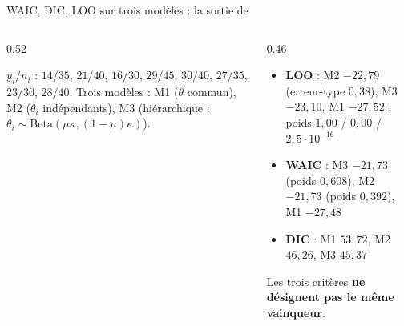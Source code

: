 \begin{frame}{WAIC, DIC, LOO sur trois modèles : la sortie de }

\vspace{-2mm}
\begin{columns}[t]
\begin{column}{0.52\textwidth}
\begin{ebox}
$y_i/n_i$ : $14/35$, $21/40$, $16/30$, $29/45$, $30/40$, $27/35$, $23/30$, $28/40$.
Trois modèles : M1 ($\theta$ commun), M2 ($\theta_i$ indépendants), M3 (hiérarchique :
$\theta_i \sim \mathrm{Beta}(\mu\kappa,(1{-}\mu)\kappa)$).
\end{ebox}
\end{column}
\begin{column}{0.46\textwidth}
\begin{solbox}
\begin{itemize}
  \item \textbf{LOO} : M2 $-22{,}79$ (erreur-type $0{,}38$), M3 $-23{,}10$,
        M1 $-27{,}52$ ; poids $1{,}00$ / $0{,}00$ / $2{,}5\cdot10^{-16}$
  \item \textbf{WAIC} : M3 $-21{,}73$ (poids $0{,}608$), M2 $-21{,}73$
        (poids $0{,}392$), M1 $-27{,}48$
  \item \textbf{DIC} : M1 $53{,}72$, M2 $46{,}26$, M3 $45{,}37$
\end{itemize}
Les trois critères \textbf{ne désignent pas le même vainqueur}.
\end{solbox}
\end{column}
\end{columns}
\end{frame}

